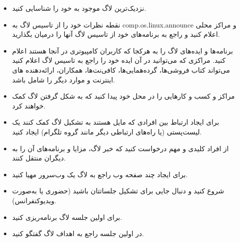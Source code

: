 \begin{itemize}
\item
نزدیک‌ترین لاگ موجود به خود را شناسایی کنید.
\item
نقطه نظرات خود را از تاسیس لاگ به
{\ttfamily comp.os.linux.announce}
و مراکز محلی اعلام کنید و راجع به برنامه‌های خود از تاسیس لاگ آنها را
درمیان بگذارید.
\item
برنامه‌ها و ایده‌های لاگ را به هرکجا که کاربران کامپیوتری در آنجا هستند
اعلام کنید. مراکزی که می‌توانید در آن ایده خود را راجع به تاسیس لاگ
اعلام کنید می‌تواند کتاب فروشی‌ها، گرده‌همایی‌ها، کافی‌نت‌ها، همکاران، ارائه‌دهنده
های اینترنت و موارد دیگر را شامل باشد.
\item
مراکز و کسب‌ و کار‌هایی را در محل خود پیدا کنید که به شکل گرفتن لاگ کمک
خواهند کرد.
\item
برای ایجاد ارتباط بین افرادی که مایل هستند به تشکیل لاگ کمک کنند یک
لیست‌پستی (یا راه‌های ارتباطی دیگر مانند گروه تلگرام) ایجاد کنید.
\item
از افراد کلیدی و مهم درخواست کنید که خبر لاگ، مزایا و برنامه‌های آن
را به دیگران منتقل کنند.
\item
برای ایجاد چند صفحه وب راجع به لاگ یک وب‌سرور مهیا کنید.

\item
شروع کنید و دنبال جایی برای تشکیل جلساتتان باشید (حضوری یا به‌صورت
ویدیوکنفرانس).
\item
برای اولین جلسه لاگ برنامه‌ریزی کنید.
\item
در اولین جلسه راجع به اهداف لاگ گفتگو کنید.
\end{itemize}

